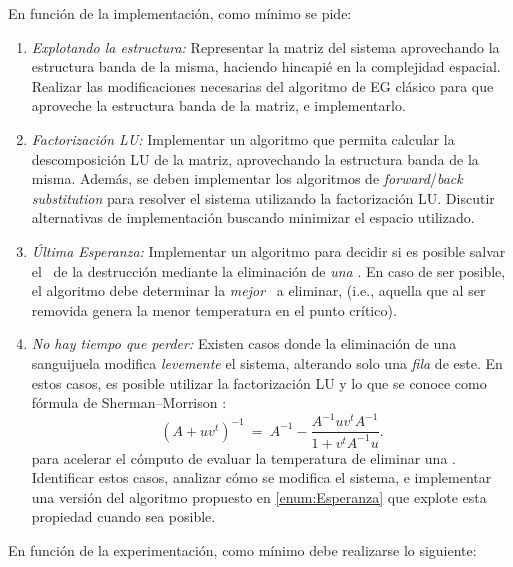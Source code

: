 En funci\'on de la implementaci\'on, como m\'inimo se pide:
\begin{enumerate}
\item \textit{Explotando la estructura:} Representar la matriz del sistema aprovechando la estructura banda de la misma, haciendo hincapi\'e en la complejidad espacial. Realizar las modificaciones necesarias del algoritmo de EG clásico para que aproveche la estructura banda de la matriz, e implementarlo. \label{enum:EGbanda}
\item \textit{Factorización LU:} Implementar un algoritmo que permita calcular la descomposición LU de la matriz, aprovechando la estructura banda de la misma. Además, se deben implementar los algoritmos de \textit{forward}/\textit{back substitution} para resolver el sistema utilizando la factorización LU. Discutir alternativas de implementación buscando minimizar el espacio utilizado. \label{enum:LU}
\item \textit{Última Esperanza:} Implementar un algoritmo para decidir si es posible salvar el \objeto\ de la destrucción mediante la eliminaci\'on de \emph{una} \atacante. En caso de ser posible, el algoritmo debe determinar la \emph{mejor} \atacante\ a eliminar, (i.e., aquella que al ser removida genera la menor temperatura en el punto cr\'itico). \label{enum:Esperanza}
\item \textit{No hay tiempo que perder:} Existen casos donde la eliminación de una sanguijuela modifica \textit{levemente} el sistema, alterando solo una \emph{fila} de este. En estos casos, es posible utilizar la factorizaci\'on LU y lo que se conoce como fórmula de Sherman–Morrison \cite{ShermanMorrison}:\\
\begin{equation}
	(A+ uv^t)^{-1} \ =\ A^{-1} - \frac{ A^{-1} u v^t A^{-1} }{1+v^t A^{-1}u}.\label{eq:sm}
\end{equation}
para acelerar el cómputo de evaluar la temperatura de eliminar una \atacante. Identificar estos casos, analizar cómo se modifica el sistema, e implementar una versión del algoritmo propuesto en \ref{enum:Esperanza} que explote esta propiedad cuando sea posible. \label{enum:SM}
\end{enumerate}
\vspace*{-0.3cm}
En funci\'on de la experimentaci\'on, como m\'inimo debe realizarse lo siguiente:
